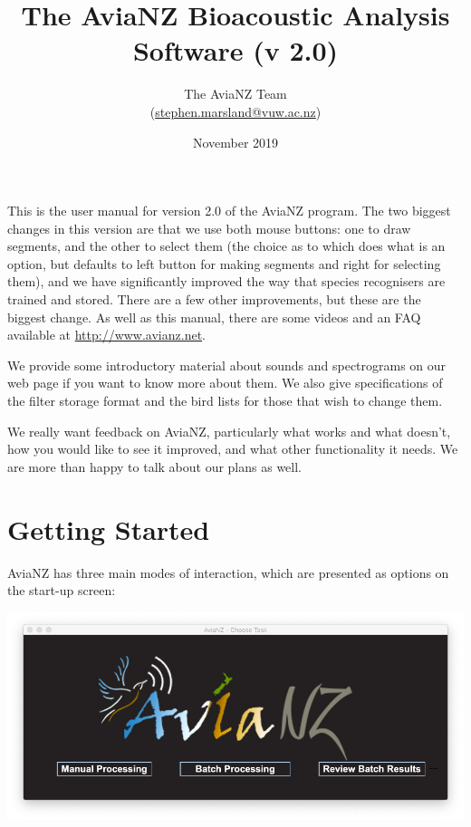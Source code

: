 \documentclass{article}
\title{The AviaNZ Bioacoustic Analysis Software (v 2.0)}
\author{The AviaNZ Team \\(\url{stephen.marsland@vuw.ac.nz})}
\date{November 2019}
\begin{document}
\maketitle

This is the user manual for version 2.0 of the AviaNZ program. The two biggest changes in this version are that we use both mouse buttons: one to draw segments, and the other to select them (the choice as to which does what is an option, but defaults to left button for making segments and right for selecting them), and we have significantly improved the way that species recognisers are trained and stored. There are a few other improvements, but these are the biggest change.
As well as this manual, there are some videos and an FAQ available at \url{http://www.avianz.net}.

We provide some introductory material about sounds and spectrograms on our web page if you want to know more about them. We also give specifications of the filter storage format and the bird lists for those that wish to change them. 
 
We really want feedback on AviaNZ, particularly what works and what doesn't, how you would like to see it improved, and what other functionality it needs. We are more than happy to talk about our plans as well. 


\tableofcontents

\newpage
\section{Getting Started}


AviaNZ has three main modes of interaction, which are presented as options on the start-up screen:

\begin{center}
\includegraphics[width=.3\textwidth]{Figs/splashscreen}
\end{center}
\end{document}
